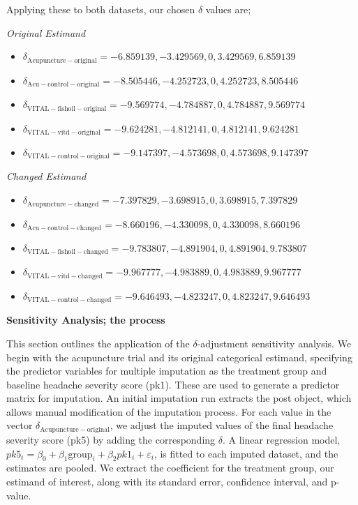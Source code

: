 \documentclass{article}
\providecommand{\tightlist}{%
  \setlength{\itemsep}{0pt}\setlength{\parskip}{0pt}}
\begin{document}
Applying these to both datasets, our chosen \(\delta\) values are;

\emph{Original Estimand}

\begin{itemize}
\tightlist
\item
  \(\delta_\mathrm{Acupuncture-original} = -6.859139,-3.429569,0,3.429569,6.859139\)
\item
  \(\delta_\mathrm{Acu-control-original} = -8.505446,-4.252723,0,4.252723,8.505446\)
\item
  \(\delta_\mathrm{VITAL-fishoil-original} = -9.569774,-4.784887,0,4.784887,9.569774\)
\item
  \(\delta_\mathrm{VITAL-vitd-original} = -9.624281,-4.812141,0,4.812141,9.624281\)
\item
  \(\delta_\mathrm{VITAL-control-original} = -9.147397,-4.573698,0,4.573698,9.147397\)
\end{itemize}

\emph{Changed Estimand}

\begin{itemize}
\tightlist
\item
  \(\delta_\mathrm{Acupuncture-changed} = -7.397829,-3.698915,0,3.698915,7.397829\)
\item
  \(\delta_\mathrm{Acu-control-changed} = -8.660196,-4.330098,0, 4.330098,8.660196\)
\item
  \(\delta_\mathrm{VITAL-fishoil-changed} = -9.783807,-4.891904,0,4.891904,9.783807\)
\item
  \(\delta_\mathrm{VITAL-vitd-changed} = -9.967777,-4.983889,0,4.983889,9.967777\)
\item
  \(\delta_\mathrm{VITAL-control-changed} = -9.646493,-4.823247,0, 4.823247,9.646493\)
\end{itemize}

\textbf{Sensitivity Analysis; the process}

This section outlines the application of the \(\delta\)-adjustment
sensitivity analysis. We begin with the acupuncture trial and its
original categorical estimand, specifying the predictor variables for
multiple imputation as the treatment group and baseline headache
severity score (pk1). These are used to generate a predictor matrix for
imputation. An initial imputation run extracts the post object, which
allows manual modification of the imputation process. For each value in
the vector \(\delta_\mathrm{Acupuncture-original}\), we adjust the
imputed values of the final headache severity score (pk5) by adding the
corresponding \(\delta\). A linear regression model,
\(pk5_i = \beta_0 + \beta_1 \text{group}_i + \beta_2 pk1_i + \varepsilon_i\),
is fitted to each imputed dataset, and the estimates are pooled. We
extract the coefficient for the treatment group, our estimand of
interest, along with its standard error, confidence interval, and
p-value.
\end{document}
